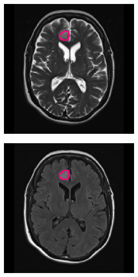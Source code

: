 \begin{subappendices}
\begin{figure}[htbp]
\begin{subfigure}[b]{0.95\textwidth}
\begin{subfigure}[b]{0.215\textwidth}
        \end{subfigure}
        \hfill
        \begin{subfigure}[b]{0.215\textwidth}
        \includegraphics[width=\textwidth, clip, trim=2.5cm 0.5cm 2.5cm 0.5cm]{Figures/Random_segs/T2_TCGA-FG-A713.png}
        \end{subfigure}
        \hfill
        \begin{subfigure}[b]{0.215\textwidth}
        \includegraphics[width=\textwidth, clip, trim=2.5cm 0.5cm 2.5cm 0.5cm]{Figures/Random_segs/FLAIR_TCGA-FG-A713.png}

\end{subfigure}
\end{subfigure}
\end{figure}
\end{subappendices}

